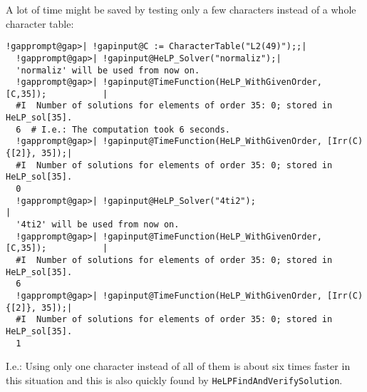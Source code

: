 \documentclass[a4paper,11pt]{report}
\begin{document}
{{ A lot of time might be saved by testing only a few characters instead of a
whole character table: 
\begin{Verbatim}[commandchars=!@|,fontsize=\small,frame=single,label=Example]
  !gapprompt@gap>| !gapinput@C := CharacterTable("L2(49)");;|
  !gapprompt@gap>| !gapinput@HeLP_Solver("normaliz");|
  'normaliz' will be used from now on.
  !gapprompt@gap>| !gapinput@TimeFunction(HeLP_WithGivenOrder, [C,35]);           |
  #I  Number of solutions for elements of order 35: 0; stored in HeLP_sol[35].
  6  # I.e.: The computation took 6 seconds.
  !gapprompt@gap>| !gapinput@TimeFunction(HeLP_WithGivenOrder, [Irr(C){[2]}, 35]);|
  #I  Number of solutions for elements of order 35: 0; stored in HeLP_sol[35].
  0
  !gapprompt@gap>| !gapinput@HeLP_Solver("4ti2");                                 |
  '4ti2' will be used from now on.
  !gapprompt@gap>| !gapinput@TimeFunction(HeLP_WithGivenOrder, [C,35]);           |
  #I  Number of solutions for elements of order 35: 0; stored in HeLP_sol[35].
  6
  !gapprompt@gap>| !gapinput@TimeFunction(HeLP_WithGivenOrder, [Irr(C){[2]}, 35]);|
  #I  Number of solutions for elements of order 35: 0; stored in HeLP_sol[35].
  1
\end{Verbatim}
 I.e.: Using only one character instead of all of them is about six times
faster in this situation and this is also quickly found by \texttt{HeLP{\textunderscore}FindAndVerifySolution}. 

}}
\end{document}
